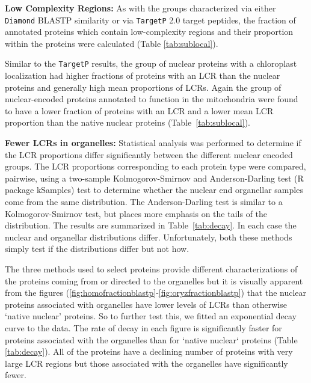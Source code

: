 \documentclass[a4paper,12pt]{article}
\newcommand{\tget}{\mbox{\texttt{TargetP}}\xspace}
\renewcommand{\diamond}{\mbox{\texttt{Diamond}}\xspace}
\begin{document}
\begin{multicols}{2}
\textbf{Low Complexity Regions:}
As with the groups characterized via either \diamond BLASTP similarity
or via \tget 2.0 target peptides, the fraction of annotated proteins which contain
low-complexity regions and their proportion within the proteins were
calculated (Table \ref{tab:sublocal}).  

Similar to the \tget results, the group of nuclear proteins with a
chloroplast localization had higher fractions of proteins with an
LCR than the nuclear proteins and generally high mean proportions of
LCRs. Again the group of nuclear-encoded proteins annotated to function
in the mitochondria were found to have a lower fraction of proteins with
an LCR and a lower mean LCR proportion than the native nuclear proteins
(Table~\ref{tab:sublocal}).

\textbf{Fewer LCRs in organelles:}
Statistical analysis was performed to determine if the LCR proportions
differ significantly between the different nuclear encoded groups.
The LCR proportions corresponding to each protein type were compared,
pairwise, using a two-sample Kolmogorov-Smirnov and Anderson-Darling test
(R package kSamples) test to determine whether the nuclear end organellar
samples come from the same distribution.  The Anderson-Darling test
is similar to a Kolmogorov-Smirnov test, but places more emphasis
on the tails of the distribution. The results are summarized in
Table~\ref{tab:decay}. In each case the nuclear and organellar
distributions differ.  Unfortunately, both these methods simply test if
the distributions differ but not how.

The three methods used to select proteins provide different
characterizations of the proteins coming from or directed to
the organelles but it is visually apparent from the figures
(\ref{fig:homofractionblastp}-\ref{fig:oryzfractionblastp}) that the
nuclear proteins associated with organelles have lower levels of LCRs
than otherwise `native nuclear' proteins. So to further test this, we
fitted an exponential decay curve to the data. The rate of decay in each
figure is significantly faster for proteins associated with the organelles
than for `native nuclear` proteins (Table \ref{tab:decay}).  All of the
proteins have a declining number of proteins with very large LCR regions
but those associated with the organelles have significantly fewer.



\end{multicols}
\end{document}

